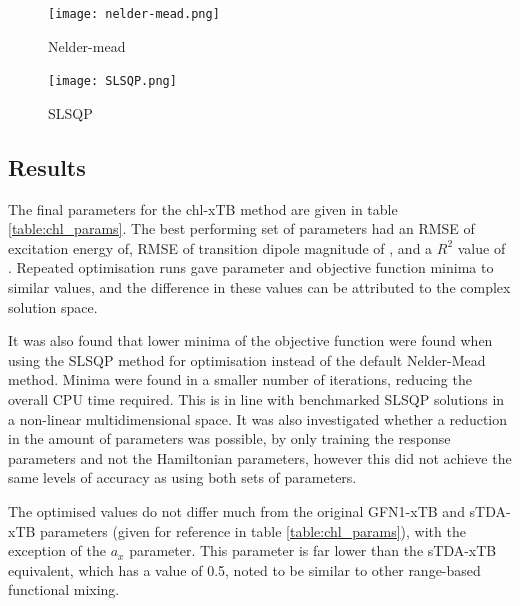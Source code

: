 \begin{figure}
    \texttt{[image: nelder-mead.png]}
    \caption{Nelder-mead}
    \label{fig:nelder_mead}
\end{figure}

\begin{figure}
    \texttt{[image: SLSQP.png]}
    \caption{SLSQP}
    \label{fig:slsqp}
\end{figure}

\afterpartskip

\subsection{Results}
\label{subsec:chl_opt_results}

The final parameters for the chl-xTB method are given in table \ref{table:chl_params}.
The best performing set of parameters had an RMSE of excitation energy of, RMSE
of transition dipole magnitude of , and a $R^2$ value of . Repeated optimisation runs
gave parameter and objective function minima to similar values, and the difference in
these values can be attributed to the complex solution space.

It was also found that lower minima of the objective function were found when using
the SLSQP method for optimisation instead of the default Nelder-Mead method. Minima
were found in a smaller number of iterations, reducing the overall CPU time required.
This is in line with benchmarked SLSQP solutions in a non-linear multidimensional space.
It was also investigated whether a reduction in the amount of parameters was possible,
by only training the response parameters and not the Hamiltonian parameters, however 
this did not achieve the same levels of accuracy as using both sets of parameters.

The optimised values do not differ much from the original GFN1-xTB and sTDA-xTB
parameters (given for reference in table \ref{table:chl_params}), with the exception
of the $a_x$ parameter. This parameter is far lower than the sTDA-xTB equivalent,
which has a value of 0.5, noted to be similar to other range-based functional mixing.

